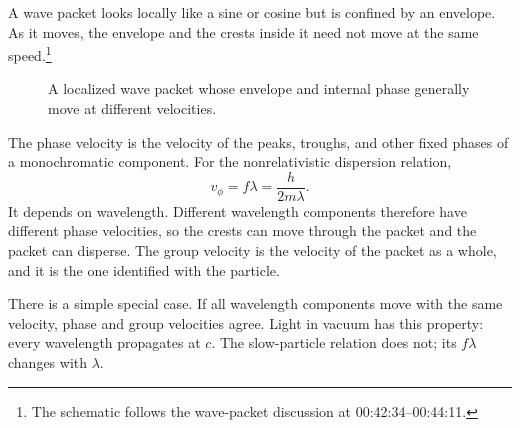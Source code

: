 \begin{classroomqa}
\end{classroomqa}

A wave packet looks locally like a sine or cosine but is confined by an envelope. As it moves, the envelope and the crests inside it need not move at the same speed.\footnote{The schematic follows the wave-packet discussion at 00:42:34--00:44:11.}

\begin{figure}[t]
\centering
{}
\caption{A localized wave packet whose envelope and internal phase generally move at different velocities.}
\end{figure}

The phase velocity is the velocity of the peaks, troughs, and other fixed phases of a monochromatic component. For the nonrelativistic dispersion relation,
\begin{equation}
v_\phi=f\lambda=\frac{h}{2m\lambda}.
\end{equation}
It depends on wavelength. Different wavelength components therefore have different phase velocities, so the crests can move through the packet and the packet can disperse. The group velocity is the velocity of the packet as a whole, and it is the one identified with the particle.

There is a simple special case. If all wavelength components move with the same velocity, phase and group velocities agree. Light in vacuum has this property: every wavelength propagates at \(c\). The slow-particle relation does not; its \(f\lambda\) changes with \(\lambda\).

